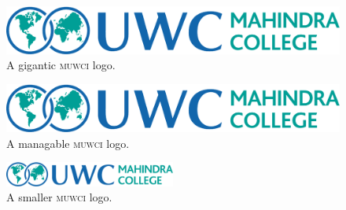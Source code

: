 \documentclass{article}
\begin{document}
    \begin{figure}[ht]
    \includegraphics{figs/muwci_logo}
    \caption{A gigantic \textsc{muwci} logo.}
    \end{figure}

    \begin{figure}[ht]
    \includegraphics[width=\textwidth]{figs/muwci_logo}
    \caption{A managable \textsc{muwci} logo.}
    \end{figure}

    \begin{figure}[ht]
    \includegraphics[width=0.5\textwidth]{figs/muwci_logo}
    \caption{A smaller \textsc{muwci} logo.}
    \end{figure}
\end{document}
